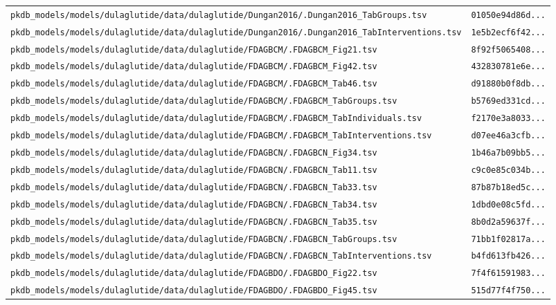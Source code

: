 \begin{longtable}{ll}
\texttt{pkdb\_models/models/dulaglutide/data/dulaglutide/Dungan2016/.Dungan2016\_TabGroups.tsv} & \texttt{01050e94d86d...} \\
\texttt{pkdb\_models/models/dulaglutide/data/dulaglutide/Dungan2016/.Dungan2016\_TabInterventions.tsv} & \texttt{1e5b2ecf6f42...} \\
\texttt{pkdb\_models/models/dulaglutide/data/dulaglutide/FDAGBCM/.FDAGBCM\_Fig21.tsv} & \texttt{8f92f5065408...} \\
\texttt{pkdb\_models/models/dulaglutide/data/dulaglutide/FDAGBCM/.FDAGBCM\_Fig42.tsv} & \texttt{432830781e6e...} \\
\texttt{pkdb\_models/models/dulaglutide/data/dulaglutide/FDAGBCM/.FDAGBCM\_Tab46.tsv} & \texttt{d91880b0f8db...} \\
\texttt{pkdb\_models/models/dulaglutide/data/dulaglutide/FDAGBCM/.FDAGBCM\_TabGroups.tsv} & \texttt{b5769ed331cd...} \\
\texttt{pkdb\_models/models/dulaglutide/data/dulaglutide/FDAGBCM/.FDAGBCM\_TabIndividuals.tsv} & \texttt{f2170e3a8033...} \\
\texttt{pkdb\_models/models/dulaglutide/data/dulaglutide/FDAGBCM/.FDAGBCM\_TabInterventions.tsv} & \texttt{d07ee46a3cfb...} \\
\texttt{pkdb\_models/models/dulaglutide/data/dulaglutide/FDAGBCN/.FDAGBCN\_Fig34.tsv} & \texttt{1b46a7b09bb5...} \\
\texttt{pkdb\_models/models/dulaglutide/data/dulaglutide/FDAGBCN/.FDAGBCN\_Tab11.tsv} & \texttt{c9c0e85c034b...} \\
\texttt{pkdb\_models/models/dulaglutide/data/dulaglutide/FDAGBCN/.FDAGBCN\_Tab33.tsv} & \texttt{87b87b18ed5c...} \\
\texttt{pkdb\_models/models/dulaglutide/data/dulaglutide/FDAGBCN/.FDAGBCN\_Tab34.tsv} & \texttt{1dbd0e08c5fd...} \\
\texttt{pkdb\_models/models/dulaglutide/data/dulaglutide/FDAGBCN/.FDAGBCN\_Tab35.tsv} & \texttt{8b0d2a59637f...} \\
\texttt{pkdb\_models/models/dulaglutide/data/dulaglutide/FDAGBCN/.FDAGBCN\_TabGroups.tsv} & \texttt{71bb1f02817a...} \\
\texttt{pkdb\_models/models/dulaglutide/data/dulaglutide/FDAGBCN/.FDAGBCN\_TabInterventions.tsv} & \texttt{b4fd613fb426...} \\
\texttt{pkdb\_models/models/dulaglutide/data/dulaglutide/FDAGBDO/.FDAGBDO\_Fig22.tsv} & \texttt{7f4f61591983...} \\
\texttt{pkdb\_models/models/dulaglutide/data/dulaglutide/FDAGBDO/.FDAGBDO\_Fig45.tsv} & \texttt{515d77f4f750...} \\

\end{longtable}
